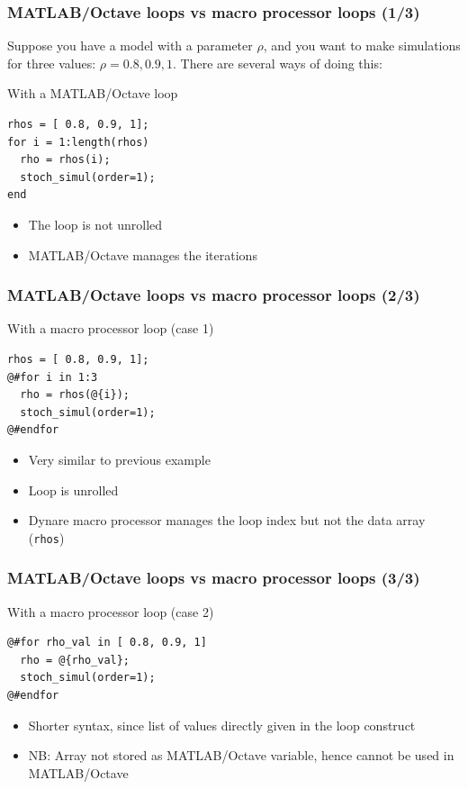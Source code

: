 \documentclass{beamer}
\begin{document}
\begin{frame}[fragile=singleslide]
  \frametitle{MATLAB/Octave loops vs macro processor loops (1/3)}
  Suppose you have a model with a parameter $\rho$, and you want to make
  simulations for three values: $\rho = 0.8, 0.9, 1$. There are
  several ways of doing this:
  \begin{block}{With a MATLAB/Octave loop}
\begin{verbatim}
rhos = [ 0.8, 0.9, 1];
for i = 1:length(rhos)
  rho = rhos(i);
  stoch_simul(order=1);
end
\end{verbatim}
  \end{block}
  \begin{itemize}
  \item The loop is not unrolled
  \item MATLAB/Octave manages the iterations
  \end{itemize}
\end{frame}

\begin{frame}[fragile=singleslide]
  \frametitle{MATLAB/Octave loops vs macro processor loops (2/3)}
  \begin{block}{With a macro processor loop (case 1)}
\begin{verbatim}
rhos = [ 0.8, 0.9, 1];
@#for i in 1:3
  rho = rhos(@{i});
  stoch_simul(order=1);
@#endfor
\end{verbatim}
  \end{block}
  \begin{itemize}
  \item Very similar to previous example
  \item Loop is unrolled
  \item Dynare macro processor manages the loop index but not the data array (\texttt{rhos})
  \end{itemize}
\end{frame}

\begin{frame}[fragile=singleslide]
  \frametitle{MATLAB/Octave loops vs macro processor loops (3/3)}
  \begin{block}{With a macro processor loop (case 2)}
\begin{verbatim}
@#for rho_val in [ 0.8, 0.9, 1]
  rho = @{rho_val};
  stoch_simul(order=1);
@#endfor
\end{verbatim}
  \end{block}
  \begin{itemize}
  \item Shorter syntax, since list of values directly given in the loop construct
  \item NB: Array not stored as MATLAB/Octave variable, hence cannot be used in MATLAB/Octave
  \end{itemize}
\end{frame}
\end{document}
